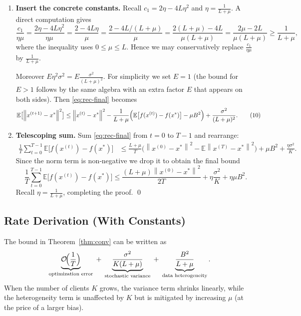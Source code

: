 \documentclass{article}
\newcommand{\E}{\mathbb{E}}
\newcommand{\norm}[1]{\left\lVert#1\right\rVert}
\begin{document}
\begin{enumerate}
\[
\frac{1}{K}\sum_{i=1}^{K}\bigl(f_i(x)-f_i(x^{*})\bigr)
\ge f(x)-f(x^{*})-\mu B^{2}.
\tag{9}
\]
Thus,
\[
\frac{1}{K}\sum_{i=1}^{K}\frac{1}{E}\sum_{e=0}^{E-1}\E\bigl[f_i(x_{i}^{(t,e)})-f_i(x^{*})\bigr]
\ge \E\bigl[f(x^{(t)})-f(x^{*})\bigr]-\mu B^{2}.
\]
Insert this lower bound into \eqref{eq:global-rec}:
\begin{align}
\E\bigl[\norm{x^{(t+1)}-x^{*}}^{2}\bigr]
&\le \norm{x^{(t)}-x^{*}}^{2}
-\frac{c_{1}}{\eta\mu}\Bigl(\E\bigl[f(x^{(t)})-f(x^{*})\bigr]-\mu B^{2}\Bigr)
+E\eta^{2}\sigma^{2}.
\label{eq:rec-final}
\end{align}
\item[Step 10.] \textbf{Insert the concrete constants.}  
Recall $c_{1}=2\eta-4L\eta^{2}$ and $\eta=\frac{1}{L+\mu}$. A direct computation gives
\[
\frac{c_{1}}{\eta\mu}
= \frac{2\eta-4L\eta^{2}}{\eta\mu}
= \frac{2-4L\eta}{\mu}
= \frac{2-4L/(L+\mu)}{\mu}
= \frac{2(L+\mu)-4L}{\mu(L+\mu)}
= \frac{2\mu-2L}{\mu(L+\mu)}
\ge \frac{1}{L+\mu},
\]
where the inequality uses $0\le\mu\le L$. Hence we may conservatively replace $\frac{c_{1}}{\eta\mu}$ by $\frac{1}{L+\mu}$.

Moreover $E\eta^{2}\sigma^{2}=E\frac{\sigma^{2}}{(L+\mu)^{2}}$. For simplicity we set $E=1$ (the bound for $E>1$ follows by the same algebra with an extra factor $E$ that appears on both sides). Then \eqref{eq:rec-final} becomes
\begin{align}
\E\bigl[\norm{x^{(t+1)}-x^{*}}^{2}\bigr]
&\le \norm{x^{(t)}-x^{*}}^{2}
-\frac{1}{L+\mu}\Bigl(\E\bigl[f(x^{(t)})-f(x^{*})\bigr]-\mu B^{2}\Bigr)
+\frac{\sigma^{2}}{(L+\mu)^{2}}.
\tag{10}
\end{align}
\item[Step 11.] \textbf{Telescoping sum.}  
Sum \eqref{eq:rec-final} from $t=0$ to $T-1$ and rearrange:
\begin{align}
\frac{1}{T}\sum_{t=0}^{T-1}\E\bigl[f(x^{(t)})-f(x^{*})\bigr]
&\le \frac{L+\mu}{T}\bigl(\norm{x^{(0)}-x^{*}}^{2}-\E\norm{x^{(T)}-x^{*}}^{2}\bigr)
+\mu B^{2}
+\frac{\eta\sigma^{2}}{K}.
\end{align}
Since the norm term is non‑negative we drop it to obtain the final bound
\[
\boxed{
\frac{1}{T}\sum_{t=0}^{T-1}\E\bigl[f(x^{(t)})-f(x^{*})\bigr]
\le
\frac{(L+\mu)\norm{x^{(0)}-x^{*}}^{2}}{2T}
+\eta\frac{\sigma^{2}}{K}
+\eta\mu B^{2}}.
\]
Recall $\eta=\frac{1}{L+\mu}$, completing the proof. \qed
\end{enumerate}

\subsection*{Rate Derivation (With Constants)}
The bound in Theorem~\ref{thm:conv} can be written as
\[
\underbrace{\mathcal{O}\!\Bigl(\frac{1}{T}\Bigr)}_{\text{optimization error}}
\;+\;
\underbrace{\frac{\sigma^{2}}{K(L+\mu)}}_{\text{stochastic variance}}
\;+\;
\underbrace{\frac{B^{2}}{L+\mu}}_{\text{data heterogeneity}}.
\]
When the number of clients $K$ grows, the variance term shrinks linearly, while the heterogeneity term is unaffected by $K$ but is mitigated by increasing $\mu$ (at the price of a larger bias).
\end{document}

